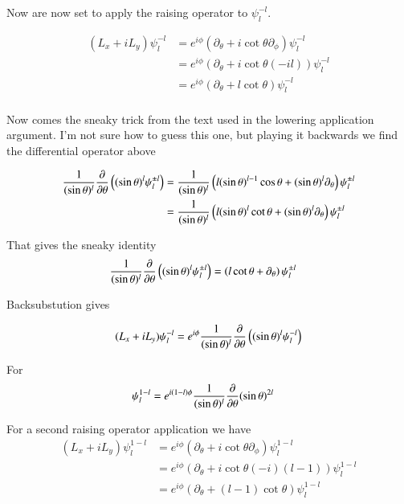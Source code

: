 Now are now set to apply the raising operator to $\psi_l^{-l}$.

\begin{align*}
(L_x + iL_y) \psi_l^{-l} 
&=
e^{i\phi} (\partial_\theta + i \cot\theta \partial_\phi) \psi_l^{-l} \\
&=
e^{i\phi} (\partial_\theta + i \cot\theta (-i l)) \psi_l^{-l} \\
&=
e^{i\phi} (\partial_\theta + l \cot\theta ) \psi_l^{-l} \\
\end{align*}

Now comes the sneaky trick from the text used in the lowering application argument.  I'm not sure how to guess this one, but playing it backwards we find the differential operator above

\begin{align*}
\frac{1}{(\sin\theta)^l} \frac{\partial {}}{\partial {\theta}} \left( (\sin\theta)^l \psi_l^{\pm l} \right)
&=
\frac{1}{(\sin\theta)^l} \left( l (\sin\theta)^{l-1} \cos\theta + (\sin\theta)^l \partial_\theta \right) \psi_l^{\pm l} \\
&=
\frac{1}{(\sin\theta)^l} \left( l (\sin\theta)^{l} \cot\theta + (\sin\theta)^l \partial_\theta \right) \psi_l^{\pm l} \\
\end{align*}

That gives the sneaky identity
\begin{align}\label{eqn:sphericalHarmonicRaising:sneaky}
\frac{1}{(\sin\theta)^l} \frac{\partial {}}{\partial {\theta}} \left( (\sin\theta)^l \psi_l^{\pm l} \right)
&=
\left( l \cot\theta + \partial_\theta \right) \psi_l^{\pm l} 
\end{align}

Backsubstution gives

\begin{align*}
(L_x + iL_y) \psi_l^{-l} 
&=
e^{i\phi} \frac{1}{(\sin\theta)^l} \frac{\partial {}}{\partial {\theta}} \left( (\sin\theta)^l \psi_l^{-l} \right) \\
\end{align*}

For
\begin{align}\label{eqn:sphericalHarmonicRaising:minusLplus1}
\psi_l^{1-l}
&=
e^{i(1-l)\phi} \frac{1}{(\sin\theta)^l} \frac{\partial {}}{\partial {\theta}} (\sin\theta)^{2l}
\end{align}

For a second raising operator application we have
\begin{align*}
(L_x + iL_y) \psi_l^{1-l} 
&=
e^{i\phi} (\partial_\theta + i \cot\theta \partial_\phi) \psi_l^{1-l} \\
&=
e^{i\phi} (\partial_\theta + i \cot\theta (-i)(l-1)) \psi_l^{1-l} \\
&=
e^{i\phi} (\partial_\theta + (l-1)\cot\theta ) \psi_l^{1-l} \\
\end{align*}

